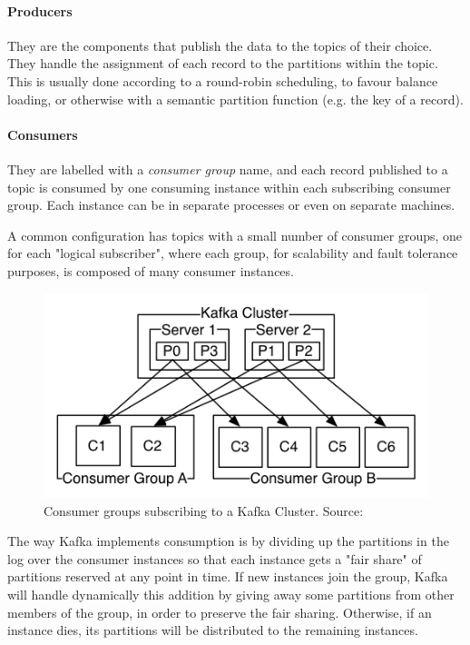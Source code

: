 \paragraph{Producers} They are the components that publish the data to the topics of their choice. They handle the assignment of each record to the partitions within the topic. This is usually done according to a round-robin scheduling, to favour balance loading, or otherwise with a semantic partition function (e.g. the key of a record).

\paragraph{Consumers} They are labelled with a \textit{consumer group} name, and each record published to a topic is consumed by one consuming instance within each subscribing consumer group. Each instance can be in separate processes or even on separate machines.

A common configuration has topics with a small number of consumer groups, one for each "logical subscriber", where each group, for scalability and fault tolerance purposes, is composed of many consumer instances.

\begin{figure}[h]
    \centering
    \includegraphics[width=0.7\linewidth]{Figures/consumer-groups}
    \caption[Consumer groups subscribing to a Kafka Cluster]{Consumer groups subscribing to a Kafka Cluster. Source: \cite{kafka_doc}}
    \label{fig:consumer-groups}
\end{figure}


The way Kafka implements consumption is by dividing up the partitions in the log over the consumer instances so that each instance gets a "fair share" of partitions reserved at any point in time. If new instances join the group, Kafka will handle dynamically this addition by giving away some partitions from other members of the group, in order to preserve the fair sharing. Otherwise, if an instance dies, its partitions will be distributed to the remaining instances.

